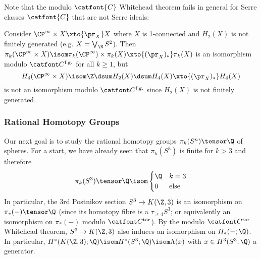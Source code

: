 Note that the modulo $\catfont{C}$ Whitehead theorem fails in general for Serre classes $\catfont{C}$ that are not Serre ideals:
\begin{example}
	Consider $\CP^\infty \times X \xto{\pr_X} X$ where $X$ is 1-connected and $H_2(X)$ is not finitely generated (e.g. $X = \bigvee_{\N} S^2$).
	Then $\pi_k(\CP^\infty \times X) \isom \pi_k(\CP^\infty) \times \pi_k(X) \xto{(\pr_X)_*} \pi_k(X)$ is an isomorphism modulo $\Cfg$ for all $k \geq 1$, but
	\begin{equation*}
		H_4(\CP^\infty \times X) \isom \Z \dsum H_2(X) \dsum H_4(X) \xto{(\pr_X)_*} H_4(X)
	\end{equation*}
	is not an isomorphism modulo $\Cfg$ since $H_2(X)$ is not finitely generated.
\end{example}

\subsubsection{Rational Homotopy Groups}
Our next goal is to study the rational homotopy groups $\pi_k(S^n) \tensor \Q$ of spheres. 
For a start, we have already seen that $\pi_k(S^3)$ is finite for $k > 3$ and therefore
\begin{equation*}
	\pi_k(S^3) \tensor \Q \isom \begin{cases}
		\Q 	& k = 3 \\
		0 	& \text{else}
	\end{cases}
\end{equation*}
In particular, the 3rd Postnikov section $S^3 \to K(\Z, 3)$ is an isomorphism on $\pi_*({{-}}) \tensor \Q$ (since its homotopy fibre is a $\tau_{\geq 4} S^3$; or equivalently an isomorphism on $\pi_*({{-}})$ modulo $\Ctor$).
By the modulo $\Ctor$ Whitehead theorem, $S^3 \to K(\Z, 3)$ also induces an isomorphism on $H_*({{-}}; \Q)$.
In particular, $H^*(K(\Z, 3); \Q) \isom H^*(S^3; \Q) \isom \Lambda(x)$ with $x \in H^3(S^3; \Q)$ a generator.

